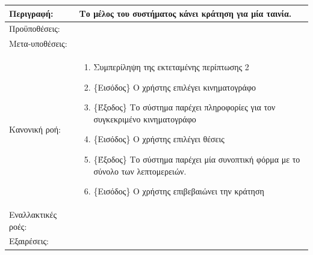 \documentclass{assignment}
\begin{document}
\begin{longtable}{| p{3.5cm} | p{9cm} |}
\hline
Περιγραφή: &
Το μέλος του συστήματος κάνει κράτηση για μία ταινία.\\
\hline
Προϋποθέσεις: &\mbox{}\par\vspace{-\baselineskip}
\\
\hline
Μετα-υποθέσεις: & \\
\hline
Κανονική ροή: &\mbox{}\par\vspace{-\baselineskip}
\begin{enumerate}
\item Συμπερίληψη της εκτεταμένης περίπτωσης 2
\item \{Εισόδος\} Ο χρήστης επιλέγει κινηματογράφο
\item \{Έξοδος\} Το σύστημα παρέχει πληροφορίες για τον συγκεκριμένο κινηματογράφο
\item \{Εισόδος\} Ο χρήστης επιλέγει θέσεις
\item \{Έξοδος\} Το σύστημα παρέχει μία συνοπτική φόρμα με το σύνολο των λεπτομερειών.
\item \{Εισόδος\} Ο χρήστης επιβεβαιώνει την κράτηση
\end{enumerate}\\
\hline
Εναλλακτικές ροές: &\mbox{}\par\vspace{-\baselineskip} 
\\
\hline
Εξαιρέσεις: &\mbox{}\par\vspace{-\baselineskip} 


\end{longtable}
\end{document}
